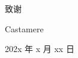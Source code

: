 
\begin{center} \heiti\sanhao 致谢 \end{center}

\lipsum[7-8]

\begin{flushright}
    Castamere

    202x 年 x 月 xx 日
\end{flushright}
